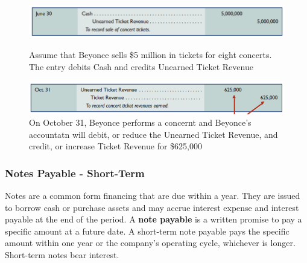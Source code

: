 \documentclass[../main.tex]{subfiles}
\begin{document}
	\begin{figure}[ht]
		\centering
		\includegraphics[width=1\columnwidth]{images/c10_unearned_revenues1.png}
		\caption{Assume that Beyonce sells \$5 million in tickets for eight 
			concerts. The entry debits Cash and credits Unearned Ticket Revenue}
		\includegraphics[width=1\columnwidth]{images/c10_unearned_revenues2.png}
		\caption{On October 31, Beyonce performs a concernt and Beyonce's 
			accountatn will debit, or reduce the Unearned Ticket Revenue, and 
			credit, or increase Ticket Revenue for \$625,000}
	\end{figure}
	
	\subsubsection{Notes Payable - Short-Term}
	
	Notes are a common form financing that are due within a year. They are 
	issued to borrow cash or purchase assets and may accrue interest expense 
	and interest payable at the end of the period. A \textbf{note payable} is a 
	written promise to pay a specific amount at a future date. A short-term 
	note payable pays the specific amount within one year or the company's 
	operating cycle, whichever is longer. Short-term notes bear interest. 
	
\end{document}
